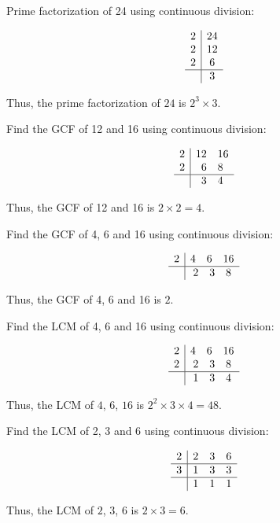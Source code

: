 \documentclass{article}
\begin{document}
Prime factorization of 24 using continuous division:

\[
\begin{array}{c|c}
    2 & 24 \\
    2 & 12  \\
    2 & 6  \\
          \hline
    & 3  \\
\end{array}
\]

Thus, the prime factorization of \(24\) is \( 2^3 \times 3 \).


\vspace{1cm}

Find the GCF of 12 and 16 using continuous division:

\[
\begin{array}{c|c}
    2 & 12\ \ \ 16\\
    2 & 6\ \ \  8\\
          \hline
       & 3\ \ \  4\\
\end{array}
\]

Thus, the GCF of 12 and 16 is $2 \times 2  = 4$.

\vspace{1cm}


Find the GCF of 4, 6 and 16 using continuous division:

\[
\begin{array}{c|c}
    2 & 4 \ \ \ 6\ \ \ 16\\
    \hline
    &2 \ \ \ 3 \ \ \ 8 \\
\end{array}
\]

Thus, the GCF of 4, 6 and 16 is $2$.


\vspace{1cm}

Find the LCM of 4, 6 and 16 using continuous division:

\[
\begin{array}{c|c}
    2 & 4 \ \ \ 6\ \ \ 16\\
    2 & 2 \ \ \ 3\ \ \ 8 \\
              \hline
       & 1 \ \ \ 3\ \ \ 4 \\
\end{array}
\]

Thus, the LCM of $4$, $6$, $16$ is \( 2^2 \times 3 \times 4 = 48\).

\vspace{1cm}

Find the LCM of 2, 3 and 6 using continuous division:

\[
\begin{array}{c|c}
    2 & 2 \ \ \ 3\ \ \ 6\\
    \hline
    3 & 1 \ \ \ 3\ \ \ 3 \\
     \hline
       & 1 \ \ \ 1\ \ \ 1 \\
\end{array}
\]

Thus, the LCM of $2$, $3$, $6$ is \( 2 \times 3 = 6\).
\end{document}
